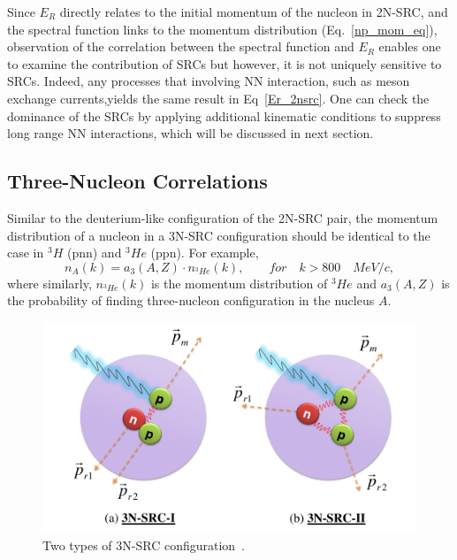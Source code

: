 Since $E_{R}$ directly relates to the initial momentum of the nucleon in 2N-SRC, and the spectral function links to the momentum distribution (Eq.~\eqref{np_mom_eq}), observation of the correlation between the spectral function and $E_{R}$ enables one to examine the contribution of SRCs but however, it is not uniquely sensitive to SRCs. Indeed, any processes that involving NN interaction, such as meson exchange currents,yields the same result in Eq~\eqref{Er_2nsrc}. One can check the dominance of the SRCs by applying additional kinematic conditions to suppress long range NN interactions, which will be discussed in next section.

\subsection{Three-Nucleon Correlations}
Similar to the deuterium-like configuration of the 2N-SRC pair, the momentum distribution of a nucleon in a 3N-SRC configuration should be identical to the case in $^{3}H$ (pnn) and $^{3}He$ (ppn). For example,
\begin{equation}
  n_{A}(k) = a_{3}(A,Z)\cdot n_{^{3}He}(k), \qquad for\quad k>800 \quad MeV/c,
  \label{3nsrc_mon_scaling}
\end{equation}  
where similarly, $n_{^{3}He}(k)$ is the momentum distribution of $^{3}He$ and $a_{3}(A,Z)$ is the probability of finding three-nucleon configuration in the nucleus $A$. 
\begin{figure}[!ht]
  \begin{center}
    \includegraphics[type=pdf,ext=.pdf,read=.pdf,width=0.80\linewidth]{./figures/physics/3nsrc_two_types}
    \caption[Two types of 3N-SRC configuration]{\footnotesize{Two types of 3N-SRC configuration~\cite{Frankfurt_misak}.}}
    \label{3nsrc_two_types}
  \end{center}
\end{figure}

